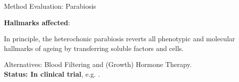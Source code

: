 \begin{frame}[c]{Method Evaluation: Parabiosis}
    \large



    \textbf{Hallmarks affected}:
    \begin{aquote}{\cite{conese2017fountain}}
        In principle, the heterochonic parabiosis reverts all phenotypic and molecular hallmarks of ageing by transferring soluble factors and cells.
    \end{aquote}

    \pause
    Alternatives: Blood Filtering and (Growth) Hormone Therapy. \\
    \pause
    \textbf{Status: In clinical trial}, e.g. \cite{AStudyto73:online}.
\end{frame}


